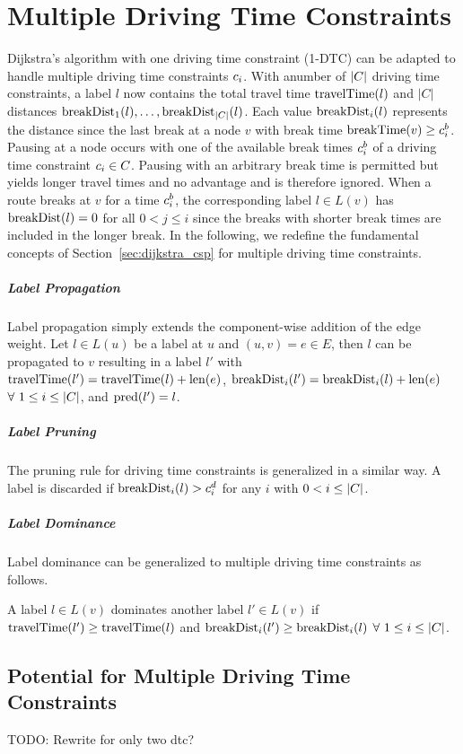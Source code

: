 \section{Multiple Driving Time Constraints\label{section:n_csp}}
Dijkstra's algorithm with one driving time constraint (1-DTC) can be adapted to handle multiple driving time constraints $c_i$. With anumber of $|C|$ driving time constraints, a label $l$ now contains the total travel time $\operatorname{travelTime}(l)$ and $|C|$ distances $\operatorname{breakDist}_1(l), \ldots , \operatorname{breakDist}_{|C|}(l)$. Each value $\operatorname{breakDist}_i(l)$ represents the distance since the last break at a node $v$ with break time $\operatorname{breakTime}(v) \ge c_i^b$. Pausing at a node occurs with one of the available break times $c_i^b$ of a driving time constraint $c_i \in C$. Pausing with an arbitrary break time is permitted but yields longer travel times and no advantage and is therefore ignored. When a route breaks at $v$ for a time $c_i^b$, the corresponding label $l \in L(v)$ has $\operatorname{breakDist}(l) = 0$ for all $0 < j \le i$ since the breaks with shorter break times are included in the longer break. In the following, we redefine the fundamental concepts of Section~\ref{sec:dijkstra_csp} for multiple driving time constraints.

\subparagraph{Label Propagation}
Label propagation simply extends the component-wise addition of the edge weight. Let $l \in L(u)$ be a label at $u$ and $(u,v) = e \in E$, then $l$ can be propagated to $v$ resulting in a label $l'$ with $\operatorname{travelTime}(l') = \operatorname{travelTime}(l) + \operatorname{len}(e)$, $\operatorname{breakDist}_i(l') = \operatorname{breakDist}_i(l) + \operatorname{len}(e)$ $\forall\ 1 \le i \le |C|$, and $\operatorname{pred}(l') = l$.

\subparagraph{Label Pruning}
The pruning rule for driving time constraints is generalized in a similar way. A label is discarded if $\operatorname{breakDist}_i(l) > c_i^d$ for any $i$ with $0 < i \le |C|$.


\subparagraph{Label Dominance}
Label dominance can be generalized to multiple driving time constraints as follows.

\begin{definition}
	A label $l \in L(v)$ dominates another label $l' \in L(v)$ if $\operatorname{travelTime}(l') \ge \operatorname{travelTime}(l)$ and $\operatorname{breakDist}_i(l') \ge \operatorname{breakDist}_i(l)$ $\forall\ 1 \le i \le |C|$.
\end{definition}

\subsection{Potential for Multiple Driving Time Constraints\label{section:potential_n_csp}}
TODO: Rewrite for only two dtc?

